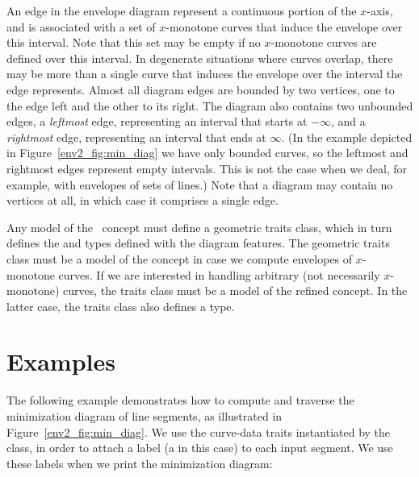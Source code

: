 An edge in the envelope diagram represent a continuous portion of the
$x$-axis, and is associated with a set of $x$-monotone curves that
induce the envelope over this interval. Note that this set may be
empty if no $x$-monotone curves are defined over this interval. In
degenerate situations where curves overlap, there may be more than
a single curve that induces the envelope over the interval the edge
represents. Almost all diagram edges are bounded by two vertices, one
to the edge left and the other to its right. The diagram also contains
two unbounded edges, a {\em leftmost} edge, representing an interval
that starts at $-\infty$, and a {\em rightmost} edge, representing an
interval that ends at $\infty$. (In the example depicted in 
Figure~\ref{env2_fig:min_diag} we have only bounded curves, so the
leftmost and rightmost edges represent empty intervals. This is not
the case when we deal, for example, with envelopes of sets of lines.)
Note that a diagram may contain no vertices at all, in which case it
comprises a single edge.

Any model of the \ccRefName\ concept must define a geometric
traits class, which in turn defines the  and 
 types defined with the diagram features.
The geometric traits class must be a model of the 
 concept in case we compute
envelopes of $x$-monotone curves. If we are interested in handling
arbitrary (not necessarily $x$-monotone) curves, the traits class
must be a model of the refined  concept.
In the latter case, the traits class also defines a 
type.

\section{Examples}

The following example demonstrates how to compute and traverse the
minimization diagram of line segments, as illustrated in
Figure~\ref{env2_fig:min_diag}. We use the curve-data traits
instantiated by the  class, in order to
attach a label (a  in this case) to each input segment.
We use these labels when we print the minimization diagram:


